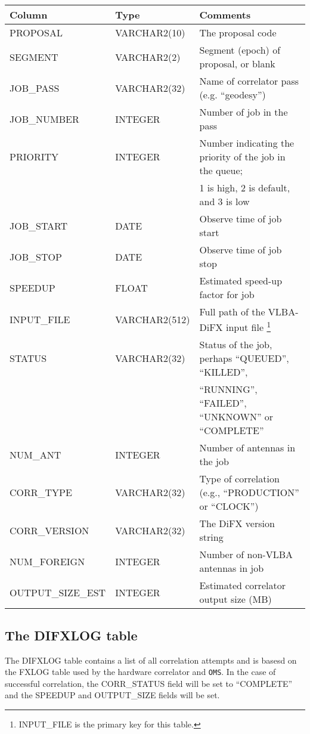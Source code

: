 \begin{center}
\begin{tabular}{lll}
\hline
\hline
   \multicolumn{1}{l}{Column}
 & \multicolumn{1}{l}{Type}
 & \multicolumn{1}{l}{Comments}
\\
\hline
PROPOSAL	& VARCHAR2(10)	& The proposal code \\
SEGMENT		& VARCHAR2(2)	& Segment (epoch) of proposal, or blank \\
JOB\_PASS	& VARCHAR2(32)	& Name of correlator pass (e.g. ``geodesy'') \\
JOB\_NUMBER	& INTEGER	& Number of job in the pass \\
PRIORITY	& INTEGER	& Number indicating the priority of the job in the queue; \\
		&		& 1 is high, 2 is default, and 3 is low \\
JOB\_START	& DATE		& Observe time of job start \\
JOB\_STOP	& DATE		& Observe time of job stop \\
SPEEDUP         & FLOAT         & Estimated speed-up factor for job \\
INPUT\_FILE	& VARCHAR2(512)	& Full path of the VLBA-DiFX input file \footnote{INPUT\_FILE is the primary key for this table.} \\
STATUS		& VARCHAR2(32)	& Status of the job, perhaps ``QUEUED'', ``KILLED'', \\
		&		& ``RUNNING'', ``FAILED'', ``UNKNOWN'' or ``COMPLETE'' \\
NUM\_ANT	& INTEGER	& Number of antennas in the job \\
CORR\_TYPE      & VARCHAR2(32)  & Type of correlation (e.g., ``PRODUCTION'' or ``CLOCK'') \\
CORR\_VERSION   & VARCHAR2(32)  & The DiFX version string \\
NUM\_FOREIGN    & INTEGER       & Number of non-VLBA antennas in job \\
OUTPUT\_SIZE\_EST & INTEGER       & Estimated correlator output size (MB) \\
\hline
\end{tabular}
\end{center}

\subsection{The DIFXLOG table}

The DIFXLOG table contains a list of all correlation attempts and is basesd on the FXLOG table used by the hardware correlator and {\tt OMS}.
In the case of successful correlation, the CORR\_STATUS field will be set to ``COMPLETE'' and the SPEEDUP and OUTPUT\_SIZE fields will be set.

